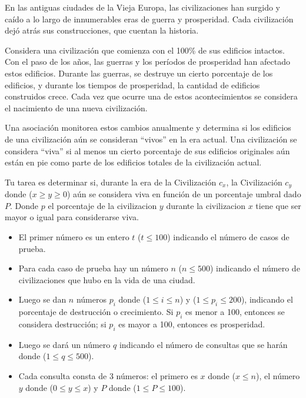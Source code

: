 
En las antiguas ciudades de la Vieja Europa, las civilizaciones han surgido y caído a lo largo de innumerables eras de guerra y prosperidad. Cada civilización dejó atrás sus construcciones, que cuentan la historia.

Considera una civilización que comienza con el 100\% de sus edificios intactos. Con el paso de los años, las guerras y los períodos de prosperidad han afectado estos edificios. Durante las guerras, se destruye un cierto porcentaje de los edificios, y durante los tiempos de prosperidad, la cantidad de edificios construidos crece. Cada vez que ocurre una de estos acontecimientos se considera el nacimiento de una nueva civilización.

Una asociación monitorea estos cambios anualmente y determina si los edificios de una civilización aún se consideran ``vivos'' en la era actual. Una civilización se considera ``viva'' si al menos un cierto porcentaje de sus edificios originales aún están en pie como parte de los edificios totales de la civilización actual.

Tu tarea es determinar si, durante la era de la Civilización $c_x$, la Civilización $c_y$ donde ($x \geq y \geq 0$) aún se considera viva en función de un porcentaje umbral dado $P$. Donde $p$ el porcentaje de la civilizacion $y$ durante la civilizacion $x$ tiene que ser mayor o igual para considerarse viva.


\begin{itemize}
    \item El primer número es un entero $t$ ($t \leq 100$) indicando el número de casos de prueba.
    \item Para cada caso de prueba hay un número $n$ ($n \leq 500$) indicando el número de civilizaciones que hubo en la vida de una ciudad.
    \item Luego se dan $n$ números $p_i$ donde ($1 \leq i \leq n$) y ($1 \leq p_i \leq 200$), indicando el porcentaje de destrucción o crecimiento. Si $p_i$ es menor a 100, entonces se considera destrucción; si $p_i$ es mayor a 100, entonces es prosperidad.
    \item Luego se dará un número $q$ indicando el número de consultas que se harán donde ($1 \leq q \leq 500$).
    \item Cada consulta consta de 3 números: el primero es $x$ donde ($x \leq n$), el número $y$ donde ($0 \leq y \leq x$) y $P$ donde ($1 \leq P \leq 100$).
\end{itemize}


